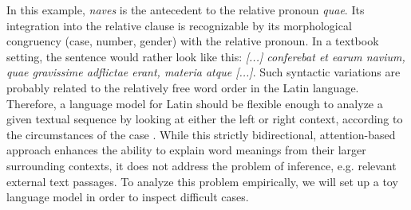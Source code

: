 \documentclass[runningheads]{llncs}
\begin{document}
In this example, \textit{naves} is the antecedent to the relative pronoun \textit{quae}. Its integration into the relative clause is recognizable by its morphological congruency (case, number, gender) with the relative pronoun. In a textbook setting, the sentence would rather look like this: \textit{[...] conferebat et earum navium, quae gravissime adflictae erant, materia atque [...]}. Such syntactic variations are probably related to the relatively free word order in the Latin language. Therefore, a language model for Latin should be flexible enough to analyze a given textual sequence by looking at either the left or right context, according to the circumstances of the case \parencite[8]{devlinBertPretrainingDeep2018}. While this strictly bidirectional, attention-based approach \parencite{vaswaniAttentionAllYou2017} enhances the ability to explain word meanings from their larger surrounding contexts, it does not address the problem of inference, e.g. relevant external text passages. To analyze this problem empirically, we will set up a toy language model in order to inspect difficult cases. 
\end{document}
